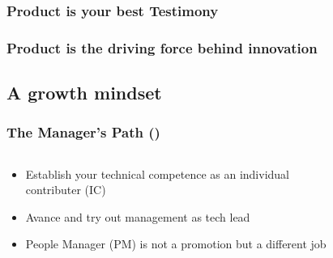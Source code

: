 \documentclass[aspectratio=169,xcolor=x11names,table]{beamer}
\begin{document}
\begin{frame}
	\frametitle{Product is your best Testimony}
\end{frame}

\begin{frame}
	\frametitle{Product is the driving force behind innovation}
\end{frame}


\subsection{A growth mindset}

\begin{frame}
	\frametitle{The Manager's Path (\cite{fournier2017manager})}
	\begin{columns}
		\begin{column}{0.7\linewidth}
			\begin{itemize}
				\item Establish your technical competence as an individual contributer (IC)
				\item Avance and try out management as tech lead
				\item People Manager (PM) is not a promotion but a different job
			\end{itemize}
		\end{column}
		\hfill
		\begin{column}{0.3\linewidth}
			\begin{figure}
				\centering

\end{figure}
\end{column}
\end{columns}
\end{frame}
\end{document}
